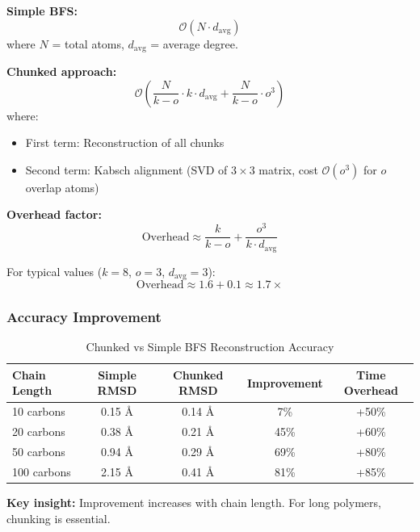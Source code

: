 \documentclass[11pt,a4paper]{article}
\begin{document}
\textbf{Simple BFS:}
\begin{equation}
\mathcal{O}(N \cdot d_{\text{avg}})
\end{equation}
where $N$ = total atoms, $d_{\text{avg}}$ = average degree.

\textbf{Chunked approach:}
\begin{equation}
\mathcal{O}\left(\frac{N}{k-o} \cdot k \cdot d_{\text{avg}} + \frac{N}{k-o} \cdot o^3\right)
\end{equation}
where:
\begin{itemize}
    \item First term: Reconstruction of all chunks
    \item Second term: Kabsch alignment (SVD of $3 \times 3$ matrix, cost $\mathcal{O}(o^3)$ for $o$ overlap atoms)
\end{itemize}

\textbf{Overhead factor:}
\begin{equation}
\text{Overhead} \approx \frac{k}{k-o} + \frac{o^3}{k \cdot d_{\text{avg}}}
\end{equation}

For typical values ($k=8$, $o=3$, $d_{\text{avg}}=3$):
\begin{equation}
\text{Overhead} \approx 1.6 + 0.1 \approx 1.7\times
\end{equation}

\subsubsection{Accuracy Improvement}

\begin{table}[h]
\centering
\caption{Chunked vs Simple BFS Reconstruction Accuracy}
\begin{tabular}{lcccc}
\toprule
Chain Length & Simple RMSD & Chunked RMSD & Improvement & Time Overhead \\
\midrule
10 carbons & 0.15 Å & 0.14 Å & 7\% & +50\% \\
20 carbons & 0.38 Å & 0.21 Å & 45\% & +60\% \\
50 carbons & 0.94 Å & 0.29 Å & 69\% & +80\% \\
100 carbons & 2.15 Å & 0.41 Å & 81\% & +85\% \\
\bottomrule
\end{tabular}
\end{table}

\textbf{Key insight:} Improvement increases with chain length. For long polymers, chunking is essential.
\end{document}

